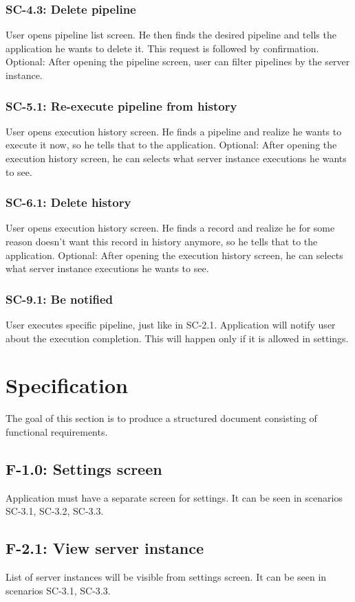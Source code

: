 \subsubsection*{SC-4.3: Delete pipeline}
User opens pipeline list screen. He then finds the desired pipeline and tells the application he wants to delete it. This request is followed by confirmation. Optional: After opening the pipeline screen, user can filter pipelines by the server instance.
\subsubsection*{SC-5.1: Re-execute pipeline from history}
User opens execution history screen. He finds a pipeline and realize he wants to execute it now, so he tells that to the application. Optional: After opening the execution history screen, he can selects what server instance executions he wants to see.
\subsubsection*{SC-6.1: Delete history}
User opens execution history screen. He finds a record and realize he for some reason doesn't want this record in history anymore, so he tells that to the application. Optional: After opening the execution history screen, he can selects what server instance executions he wants to see.
\subsubsection*{SC-9.1: Be notified}
User executes specific pipeline, just like in SC-2.1. Application will notify user about the execution completion. This will happen only if it is allowed in settings.

\section{Specification}
The goal of this section is to produce a structured document consisting of functional requirements.
\subsection*{F-1.0: Settings screen}
Application must have a separate screen for settings. It can be seen in scenarios SC-3.1, SC-3.2, SC-3.3.
\subsection*{F-2.1: View server instance}
List of server instances will be visible from settings screen. It can be seen in scenarios SC-3.1, SC-3.3.
